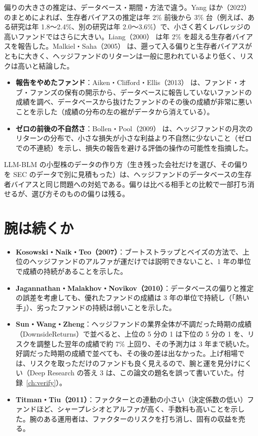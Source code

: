 偏りの大きさの推定は、データベース・期間・方法で違う。Yang ほか（2022）のまとめによれば、生存者バイアスの推定は年 2\% 前後から 3\% 台（例えば、ある研究は年 1.8〜2.4\%、別の研究は年 2.0〜3.6\%）で、小さく若くレバレッジの高いファンドではさらに大きい。Liang（2000）\cite{liang2000} は年 2\% を超える生存者バイアスを報告した。Malkiel・Saha（2005）\cite{malkielsaha2005} は、遡って入る偏りと生存者バイアスがともに大きく、ヘッジファンドのリターンは一般に思われているより低く、リスクは高いと結論した。

\begin{itemize}
\item \textbf{報告をやめたファンド}：Aiken・Clifford・Ellis（2013）\cite{ace2013} は、ファンド・オブ・ファンズの保有の開示から、データベースに報告していないファンドの成績を調べ、データベースから抜けたファンドのその後の成績が非常に悪いことを示した（成績の分布の左の裾がデータから消えている）。
\item \textbf{ゼロの前後の不自然さ}：Bollen・Pool（2009）\cite{bollenpool2009} は、ヘッジファンドの月次のリターンの分布で、小さな損失が小さな利益より不自然に少ないこと（ゼロでの不連続）を示し、損失の報告を避ける評価の操作の可能性を指摘した。
\end{itemize}

\begin{projbox}
LLM-BLM の小型株のデータの作り方（生き残った会社だけを選び、その偏りを SEC のデータで別に見積もった）は、ヘッジファンドのデータベースの生存者バイアスと同じ問題への対処である。偏りは比べる相手との比較で一部打ち消せるが、選び方そのものの偏りは残る。
\end{projbox}

\section{腕は続くか}

\begin{itemize}
\item \textbf{Kosowski・Naik・Teo（2007）}\cite{knt2007}：ブートストラップとベイズの方法で、上位のヘッジファンドのアルファが運だけでは説明できないこと、1 年の単位で成績の持続があることを示した。
\item \textbf{Jagannathan・Malakhov・Novikov（2010）}\cite{jmn2010}：データベースの偏りと推定の誤差を考慮しても、優れたファンドの成績は 3 年の単位で持続し（「熱い手」）、劣ったファンドの持続は弱いことを示した。
\item \textbf{Sun・Wang・Zheng}\cite{swz2018}：ヘッジファンドの業界全体が不調だった時期の成績（DownsideReturns）で並べると、上位の 5 分の 1 は下位の 5 分の 1 を、リスクを調整した翌年の成績で約 7\% 上回り、その予測力は 3 年まで続いた。好調だった時期の成績で並べても、その後の差は出なかった。上げ相場では、リスクを取っただけのファンドも良く見えるので、腕と運を見分けにくい（Deep Research の答え 3 は、この論文の題名を誤って書いていた。付録~\ref{ch:verify}）。
\item \textbf{Titman・Tiu（2011）}\cite{titmantiu2011}：ファクターとの連動の小さい（決定係数の低い）ファンドほど、シャープレシオとアルファが高く、手数料も高いことを示した。腕のある運用者は、ファクターのリスクを打ち消し、固有の収益を売る。
\end{itemize}

